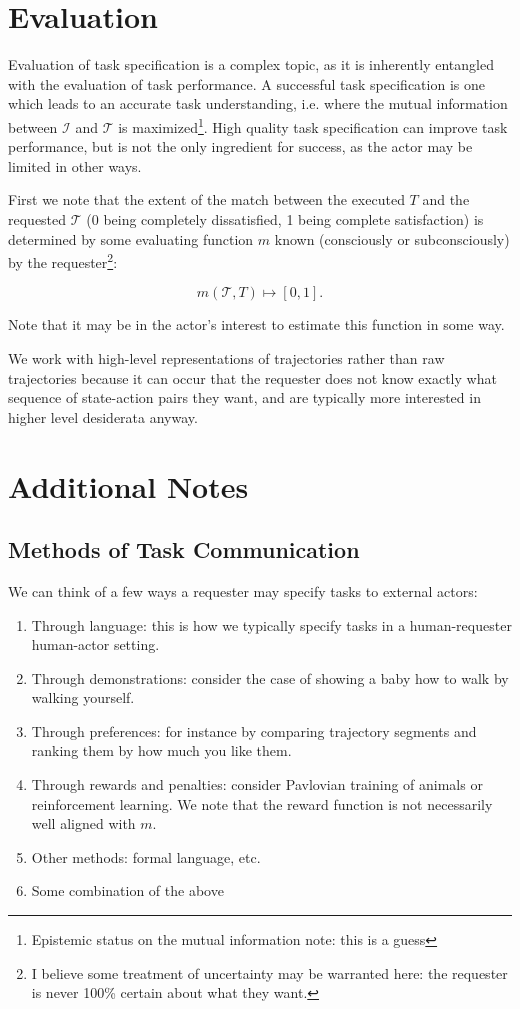 \documentclass{article}
\begin{document}
\section{Evaluation}

Evaluation of task specification is a complex topic, as it is inherently entangled with the
evaluation of task performance. A successful task specification is one which leads to an accurate
task understanding, i.e. where the mutual information between $\mathcal{I}$ and $\mathcal{T}$ is
maximized\footnote{Epistemic status on the mutual information note: this is a guess}. High quality
task specification can improve task performance, but is not the only ingredient for success, as the
actor may be limited in other ways.

First we note that the extent of the match between the executed $T$ and the requested $\mathcal{T}$
(0 being completely dissatisfied, 1 being complete satisfaction) is determined by some evaluating
function $m$ known (consciously or subconsciously) by the requester\footnote{I believe some
	treatment of uncertainty may be warranted here: the requester is never 100\% certain about what
	they want.}:

\begin{equation}
	m(\mathcal{T}, T) \mapsto [0, 1].
\end{equation}

Note that it may be in the actor's interest to estimate this function in some way.

We work with high-level representations of trajectories rather than raw trajectories because it can
occur that the requester does not know exactly what sequence of state-action pairs they want, and
are typically more interested in higher level desiderata anyway.

\section{Additional Notes}

\subsection{Methods of Task Communication}

We can think of a few ways a requester may specify tasks to external actors:
\begin{enumerate}
	\item Through language: this is how we typically specify tasks in a human-requester human-actor
	      setting.
	\item Through demonstrations: consider the case of showing a baby how to walk by walking
	      yourself.
	\item Through preferences: for instance by comparing trajectory segments and ranking them by how much you like them.
	\item Through rewards and penalties: consider Pavlovian training of animals or reinforcement
	      learning. We note that the reward function is not necessarily well aligned with $m$.
	\item Other methods: formal language, etc.
	\item Some combination of the above
\end{enumerate}
\end{document}
